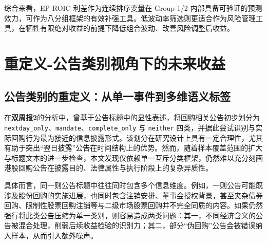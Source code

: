 \documentclass[a4paper,10pt]{article}
\begin{document}
综合来看，EP-ROIC 利差作为连续排序变量在 Group 1/2 内部具备可验证的预测效力，可作为八分组框架的有效补强工具。低波动率筛选则更适合作为风险管理工具，在牺牲有限绝对收益的前提下降低组合波动、改善风险调整后收益。















































\section{重定义-公告类别视角下的未来收益}

\subsection{公告类别的重定义：从单一事件到多维语义标签}

在\textbf{双周报2}的分析中，曾基于公告标题中的显性表述，将回购相关公告初步划分为 \texttt{nextday\_only}、\texttt{mandate}、\texttt{complete\_only} 与 \texttt{neither} 四类，并据此尝试识别与实际回购行为最为接近的信息披露形式。该划分在研究设计上具有一定合理性，尤其有助于突出“翌日披露”公告在时间结构上的优势。然而，随着样本覆盖范围的扩大与标题文本的进一步检查，本文发现仅依赖单一互斥分类框架，仍然难以充分刻画港股回购公告在披露目的、法律属性与执行阶段上的复杂异质性。

具体而言，同一则公告标题中往往同时包含多个信息维度。例如，一则公告可能既涉及股份回购的实施进展，也同时包含注销安排、董事会授权背景，甚至夹杂债券回购、限制性股票回购注销等与二级市场股票回购并不完全同质的内容。如果仍然强行将此类公告压缩为单一类别，则容易造成两类问题：其一，不同经济含义的公告被混合处理，削弱后续收益检验的识别力；其二，部分“伪回购”公告会被错误纳入样本，从而引入额外噪声。
\end{document}
